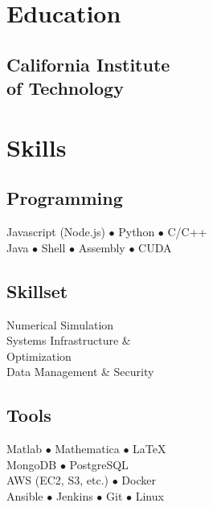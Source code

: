 \documentclass[]{deedy-resume-openfont}
\begin{document}
\begin{minipage}[t]{0.33\textwidth}


\section{Education}

    \subsection[CIT]{California Institute\\
        of Technology}
\sectionsep


\section{Skills}
    \subsection{Programming}
    Javascript (Node.js) $\bullet$ Python $\bullet$ C/C++\\
    Java $\bullet$ Shell $\bullet$ Assembly $\bullet$ CUDA\\
    \sectionsep
    \subsection{Skillset}
    Numerical Simulation\\
    Systems Infrastructure \&\\
        \tab Optimization\\
    Data Management \& Security
    \sectionsep
    \subsection{Tools}
    Matlab $\bullet$ Mathematica $\bullet$ \LaTeX\\
    MongoDB $\bullet$ PostgreSQL \\
    AWS (EC2, S3, etc.) $\bullet$ Docker\\
    Ansible $\bullet$ Jenkins $\bullet$ Git $\bullet$ Linux\\
    \sectionsep

\end{minipage}
\end{document}
